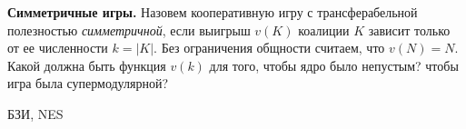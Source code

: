 \begin{problem}
 {\bf Симметричные игры.} Назовем кооперативную игру с
трансферабельной полезностью {\it симметричной}, если
выигрыш $v(K)$ коалиции $K$ зависит только от ее
численности $k=|K|$. Без ограничения общности считаем, что
$v(N)=N$. Какой должна быть функция $v(k)$ для того, чтобы
ядро было непустым? чтобы игра была супермодулярной?




\begin{source}
БЗИ, NES
\end{source}


\begin{sol}

\end{sol}
\end{problem}




